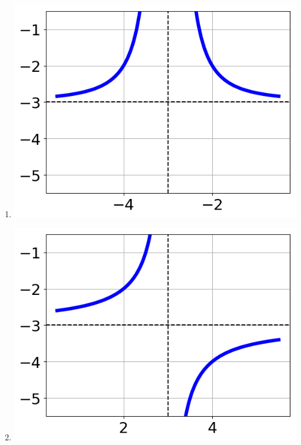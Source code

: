 \documentclass{article}[10pt]
\begin{document}
\begin{enumerate}[label=\Alph*.]
\item  
\begin{center}\includegraphics[scale=0.5]{../Figures/question35CC.png}\end{center} 
 
\item  
\begin{center}\includegraphics[scale=0.5]{../Figures/question35CA.png}\end{center} 
 

\end{enumerate}
\end{document}
